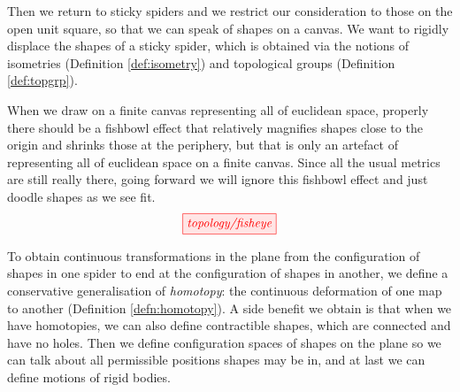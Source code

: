 
Then we return to sticky spiders and we restrict our consideration to those on the open unit square, so that we can speak of shapes on a canvas. We want to rigidly displace the shapes of a sticky spider, which is obtained via the notions of isometries (Definition \ref{def:isometry}) and topological groups (Definition \ref{def:topgrp}).

\begin{remark}
When we draw on a finite canvas representing all of euclidean space, properly there should be a fishbowl effect that relatively magnifies shapes close to the origin and shrinks those at the periphery, but that is only an artefact of representing all of euclidean space on a finite canvas. Since all the usual metrics are still really there, going forward we will ignore this fishbowl effect and just doodle shapes as we see fit.
\[\tikzfig{topology/fisheye}\]
\end{remark}


To obtain continuous transformations in the plane from the configuration of shapes in one spider to end at the configuration of shapes in another, we define a conservative generalisation of \emph{homotopy}: the continuous deformation of one map to another (Definition \ref{defn:homotopy}). A side benefit we obtain is that when we have homotopies, we can also define contractible shapes, which are connected and have no holes. Then we define configuration spaces of shapes on the plane so we can talk about all permissible positions shapes may be in, and at last we can define motions of rigid bodies.


